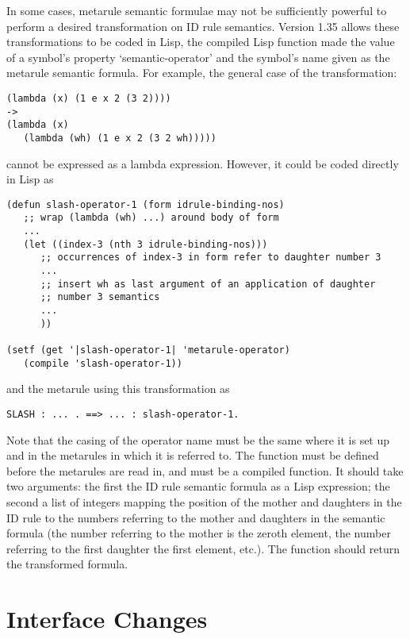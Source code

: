 In some cases, metarule semantic formulae may not be sufficiently powerful
to perform a desired transformation on ID rule semantics. Version 1.35
allows these transformations to be coded in Lisp, the compiled Lisp function
made the value of a symbol's property `semantic-operator' and the symbol's name
given as the metarule semantic formula. For example, the general case of
the transformation:
\begin{ex}
\begin{verbatim}
(lambda (x) (1 e x 2 (3 2))))
->
(lambda (x)
   (lambda (wh) (1 e x 2 (3 2 wh)))))
\end{verbatim}
\end{ex}
cannot be expressed as a lambda expression. However, it could be coded directly
in Lisp as
\begin{ex}
\begin{verbatim}
(defun slash-operator-1 (form idrule-binding-nos)
   ;; wrap (lambda (wh) ...) around body of form
   ...
   (let ((index-3 (nth 3 idrule-binding-nos)))
      ;; occurrences of index-3 in form refer to daughter number 3
      ...
      ;; insert wh as last argument of an application of daughter
      ;; number 3 semantics
      ...
      ))

(setf (get '|slash-operator-1| 'metarule-operator)
   (compile 'slash-operator-1))
\end{verbatim}
\end{ex}
and the metarule using this transformation as
\begin{ex}
\begin{verbatim}
SLASH : ... . ==> ... : slash-operator-1.
\end{verbatim}
\end{ex}
Note that the casing of the operator name must be the same where it is
set up and in the metarules in which it is referred to. The function must
be defined before the metarules are read in, and must be a compiled
function. It should take two arguments: the first the
ID rule semantic formula as a Lisp expression; the second a list
of integers mapping the position of the mother and daughters in the ID rule
to the numbers referring to the mother and daughters in the semantic formula
(the number referring to the mother is the zeroth element, the number referring
to the first daughter the first element, etc.). The function should return the
transformed formula.


\section*{Interface Changes}

